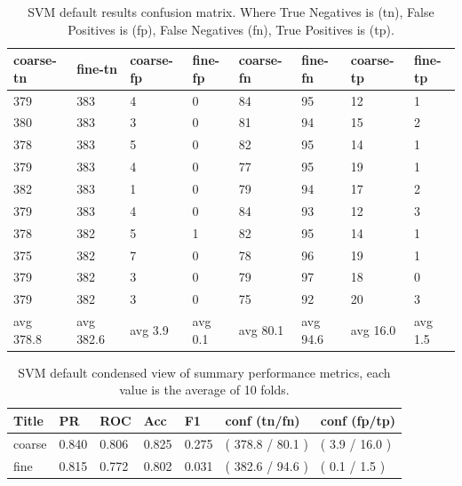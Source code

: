 \documentclass[ms]{nuthesis}
\begin{document}
\FloatBarrier
\begin{table}[H]
\centering
\caption{SVM default results confusion matrix. Where True Negatives is (tn), False Positives is (fp),
False Negatives (fn), True Positives is (tp).}
\label{tab:SVMDefConfMat}
\begin{tabular}{|l||l||l||l||l||l||l||l|}\toprule
coarse-tn & fine-tn & coarse-fp & fine-fp & coarse-fn & fine-fn & coarse-tp & fine-tp \\ \midrule
379 & 383 & 4 & 0 & 84 & 95 & 12 & 1 \\
380 & 383 & 3 & 0 & 81 & 94 & 15 & 2 \\
378 & 383 & 5 & 0 & 82 & 95 & 14 & 1 \\
379 & 383 & 4 & 0 & 77 & 95 & 19 & 1 \\
382 & 383 & 1 & 0 & 79 & 94 & 17 & 2 \\
379 & 383 & 4 & 0 & 84 & 93 & 12 & 3 \\
378 & 382 & 5 & 1 & 82 & 95 & 14 & 1 \\
375 & 382 & 7 & 0 & 78 & 96 & 19 & 1 \\
379 & 382 & 3 & 0 & 79 & 97 & 18 & 0 \\
379 & 382 & 3 & 0 & 75 & 92 & 20 & 3 \\
avg 378.8 & avg 382.6 & avg 3.9 & avg 0.1 & avg 80.1 & avg 94.6 & avg 16.0 & avg 1.5 \\ \bottomrule
\end{tabular}
\end{table}
\FloatBarrier

\FloatBarrier
\begin{table}[H]
\centering
\caption{SVM default condensed view of summary performance metrics, each value is the average
of 10 folds.}
\label{tab:SVMDef}
\begin{tabular}{|l||l||l||l||l||l||l|}\toprule
Title & PR & ROC & Acc & F1 & conf (tn/fn) & conf (fp/tp) \\ \midrule
coarse & 0.840 & 0.806 & 0.825 & 0.275 & ( 378.8 / 80.1 ) & ( 3.9 / 16.0 ) \\
fine & 0.815 & 0.772 & 0.802 & 0.031 & ( 382.6 / 94.6 ) & ( 0.1 / 1.5 ) \\ \bottomrule
\end{tabular}
\end{table}
\FloatBarrier
\end{document}
